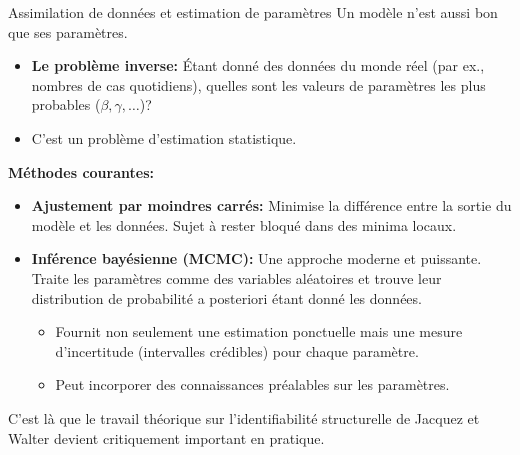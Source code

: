 \documentclass[aspectratio=169]{beamer}\usepackage[]{graphicx}\usepackage[]{xcolor}
\begin{document}
\begin{frame}{Assimilation de données et estimation de paramètres}
    Un modèle n'est aussi bon que ses paramètres.
    \begin{itemize}
        \item \textbf{Le problème inverse:} Étant donné des données du monde réel (par ex., nombres de cas quotidiens), quelles sont les valeurs de paramètres les plus probables ($\beta, \gamma, \dots$)?
        \item C'est un problème d'estimation statistique.
    \end{itemize}
    \vfill
    \textbf{Méthodes courantes:}
    \begin{itemize}
        \item \textbf{Ajustement par moindres carrés:} Minimise la différence entre la sortie du modèle et les données. Sujet à rester bloqué dans des minima locaux.
        \item \textbf{Inférence bayésienne (MCMC):} Une approche moderne et puissante. Traite les paramètres comme des variables aléatoires et trouve leur distribution de probabilité a posteriori étant donné les données.
        \begin{itemize}
            \item Fournit non seulement une estimation ponctuelle mais une mesure d'incertitude (intervalles crédibles) pour chaque paramètre.
            \item Peut incorporer des connaissances préalables sur les paramètres.
        \end{itemize}
    \end{itemize}
    C'est là que le travail théorique sur l'identifiabilité structurelle de Jacquez et Walter devient critiquement important en pratique.
\end{frame}

\end{document}
